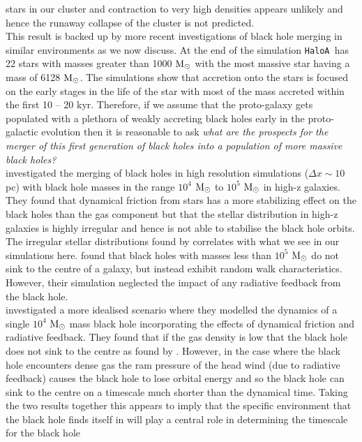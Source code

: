 \documentclass[graphics, twocolumn, usenatbib]{mn2e}
\newcommand{\msolar} {$\rm{M_{\odot}}~$}
\newcommand{\msolarc} {$\rm{M_{\odot}}$}
\newcommand{\ha} {\texttt{HaloA~}}
\begin{document}
stars in our cluster and contraction to very high densities appears unlikely and hence the
runaway collapse of the cluster is not predicted. \\
\indent This result is backed up by more recent investigations of black hole merging in similar
environments as we now discuss. 
At the end of the simulation \ha has 22 stars with masses greater than 1000 \msolar with
the most massive star having a mass of 6128 \msolarc. The simulations show that accretion onto
the stars is
focused on the early stages in the life of the star with most of the mass accreted within the
first 10 -- 20 kyr. Therefore, if we assume that the proto-galaxy gets populated with a plethora of
weakly accreting black holes early in the proto-galactic evolution then it is reasonable to ask \textit{what are the prospects for the merger of this first generation
  of black holes into a population of more massive black holes?}\\
\indent \cite{Pfister_2019} investigated the merging of black holes in high resolution
simulations ($\Delta x \sim 10$ pc) with black hole masses in the range
$10^4$ \msolar to $10^5$ \msolar in high-z galaxies. They found that dynamical friction from stars
has a more stabilizing effect on the black holes than the gas component but that the stellar
distribution in high-z galaxies is highly irregular and hence is not able to stabilise the black
hole orbits.
The irregular stellar distributions found by \cite{Pfister_2019} correlates with what
we see in our simulations here. \cite{Pfister_2019} found that black holes with masses less than
$10^5$ \msolar do not sink to the centre of a galaxy, but instead exhibit random walk characteristics.
However, their simulation neglected the impact of any radiative feedback from the black hole.\\
\indent \cite{Toyouchi_2020} investigated a more idealised scenario where they modelled the
dynamics of a single $10^4$ \msolar mass black hole incorporating the effects of dynamical friction
and radiative feedback. They found that if the gas density is low that the black hole
does not sink to the centre as found by \cite{Pfister_2019}. However, in the case where
the black hole encounters dense gas the ram pressure of the head wind (due to radiative feedback)
causes the black hole to lose orbital energy and so the black hole can sink to the centre on a
timescale much shorter than the dynamical time. Taking the two results together this
appears to imply that the specific environment that the black hole finds
itself in will play a central role in determining the timescale for the black hole
\end{document}
